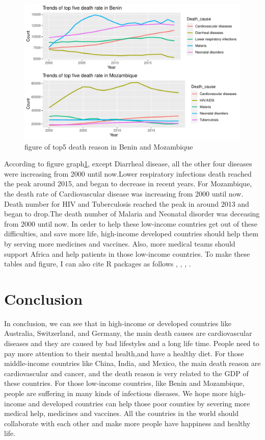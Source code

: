 \documentclass[11pt,a4paper,]{article}
\begin{document}
\begin{figure}
\centering
\includegraphics{Assignment4_files/figure-latex/topfiveplot-1.pdf}
\caption{\label{fig:topfiveplot}figure of top5 death reason in Benin and Mozambique}
\end{figure}

According to figure graph\ref{fig:topfiveplot}, except Diarrheal disease, all the other four diseases were increasing from 2000 until now.Lower respiratory infections death reached the peak around 2015, and began to decrease in recent years. For Mozambique, the death rate of Cardiovascular disease was increasing from 2000 until now. Death number for HIV and Tuberculosis reached the peak in around 2013 and began to drop.The death number of Malaria and Neonatal disorder was deceasing from 2000 until now. In order to help these low-income countries get out of these difficulties, and save more life, high-income developed countries should help them by serving more medicines and vaccines. Also, more medical teams should support Africa and help patients in those low-income countries. To make these tables and figure, I can also cite R packages as follows \textcite{tidyverse}, \textcite{ggplot2}, \textcite{readr}, \textcite{gridExtra}.

\clearpage

\hypertarget{conclusion}{%
\section{Conclusion}\label{conclusion}}

In conclusion, we can see that in high-income or developed countries like Australia, Switzerland, and Germany, the main death causes are cardiovascular diseases and they are caused by bad lifestyles and a long life time. People need to pay more attention to their mental health,and have a healthy diet. For those middle-income countries like China, India, and Mexico, the main death reason are cardiovascular and cancer, and the death reason is very related to the GDP of these countries. For those low-income countries, like Benin and Mozambique, people are suffering in many kinds of infectious diseases. We hope more high-income and developed countries can help those poor counties by severing more medical help, medicines and vaccines. All the countries in the world should collaborate with each other and make more people have happiness and healthy life.

\clearpage

\printbibliography
\end{document}
